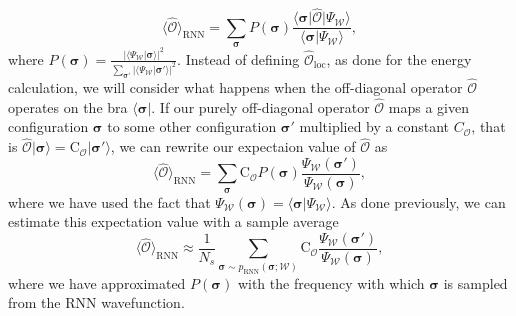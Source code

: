 \documentclass[twocolumn,
                showpacs,
                nofootinbib,
                nobibnotes,
                aps,
                superscriptaddress,
                amssymb,
                amsmath,
                floatfix,
                reprint,
                prx, 
                notitlepage,
                showkeys,
                10pt,
		]{revtex4-2}
\begin{document}
\begin{equation*}
    \langle\hat{\mathcal{O}}\rangle_{\text{RNN}} = \sum_{\boldsymbol\sigma} P(\boldsymbol\sigma)\frac{\langle \boldsymbol\sigma\vert \hat{\mathcal{O}} \vert \Psi_{\mathcal{W}}\rangle}{\langle \boldsymbol\sigma\vert \Psi_{\mathcal{W}}\rangle},
\end{equation*}
where $P(\boldsymbol\sigma) = \frac{\vert\langle \Psi_{\mathcal{W}}\vert\boldsymbol\sigma\rangle\vert^2}{\sum_{\boldsymbol\sigma\prime} \vert\langle \Psi_{\mathcal{W}}\vert\boldsymbol\sigma\prime \rangle \vert^2}$. Instead of defining $\hat{\mathcal{O}}_{\text{loc}}$, as done for the energy calculation, we will consider what happens when the off-diagonal operator $\hat{\mathcal{O}}$ operates on the bra $\langle \boldsymbol\sigma\vert$. If our purely off-diagonal operator $\hat{\mathcal{O}}$ maps a given configuration $\boldsymbol\sigma$ to some other configuration $\boldsymbol\sigma\prime$ multiplied by a constant $C_{\mathcal{O}}$, that is
$\hat{\mathcal{O}}\vert\boldsymbol\sigma\rangle = \text{C}_{\mathcal{O}} \vert \boldsymbol\sigma\prime\rangle$, we can rewrite our expectaion value of $\hat{\mathcal{O}}$ as
\begin{equation*}
    \langle\hat{\mathcal{O}}\rangle_{\text{RNN}} = \sum_{\boldsymbol\sigma} \text{C}_{\mathcal{O}} P(\boldsymbol\sigma)\frac{ \Psi_{\mathcal{W}}(\boldsymbol\sigma\prime)}{\Psi_{\mathcal{W}}(\boldsymbol\sigma)},
\end{equation*}
where we have used the fact that $\Psi_{\mathcal{W}}(\boldsymbol\sigma) = \langle \boldsymbol\sigma\vert\Psi_{\mathcal{W}}\rangle$. As done previously, we can estimate this expectation value with a sample average
\begin{equation*}
    \langle\hat{\mathcal{O}}\rangle_{\text{RNN}} \approx \frac{1}{N_s}\sum_{\boldsymbol\sigma\sim p_{\text{RNN}}(\boldsymbol\sigma;\mathcal{W})} \text{C}_{\mathcal{O}} \frac{ \Psi_{\mathcal{W}}(\boldsymbol\sigma\prime)}{\Psi_{\mathcal{W}}(\boldsymbol\sigma)},
\end{equation*}
where we have approximated $P(\boldsymbol\sigma)$ with the frequency with which $\boldsymbol\sigma$ is sampled from the RNN wavefunction.
\end{document}
